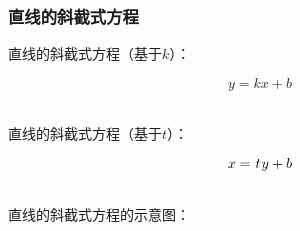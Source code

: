 \documentclass[UTF8]{ctexart}
\begin{document}
\subsubsection{直线的斜截式方程}
    直线的斜截式方程（基于$k$）：
    \begin{large}
        \begin{equation*}
            y=kx+b
        \end{equation*}
    \end{large}\\
    直线的斜截式方程（基于$t$\hspace{1.50pt}）：
    \begin{large}
        \begin{equation*}
            x=\hspace{0.7pt}t\hspace{0.7pt}y+b
        \end{equation*}
    \end{large}\\
    直线的斜截式方程的示意图：
\end{document}
